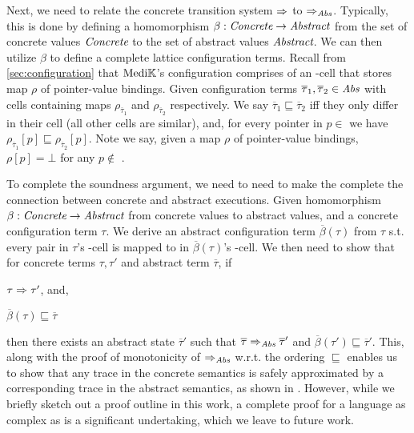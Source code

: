 Next, we need to relate the concrete transition system $\Rightarrow$ to $\Rightarrow_{\textit{Abs}}$.
Typically, this is done by defining a homomorphism $\beta: \textit{Concrete} \to \textit{Abstract}$
from the set of concrete values $\textit{Concrete}$ to the set of abstract values
$\textit{Abstract}$. We can then utilize $\beta$ to define a complete lattice
configuration terms. Recall from \autoref{sec:configuration} that
$\text{Medi}\mathbb{K}{}{}$'s configuration comprises of an -cell that
stores map $\rho$ of pointer-value bindings.
Given configuration terms $\overline{\tau}_1, \overline{\tau}_2 \in
\textit{Abs}$ with  cells containing maps $\rho_{\overline{\tau}_1}$ and
$\rho_{\overline{\tau}_2}$ respectively.
We say $\overline{\tau}_1 \sqsubseteq \overline{\tau}_2$ iff
they only differ in their
 cell (all other cells are similar), and, for every
pointer in $p \in$ 
we have $\rho_{\overline{\tau}_1}[p] \sqsubseteq \rho_{\overline{\tau}_2}[p]$. Note we
say, given a map $\rho$ of pointer-value bindings,
$\rho[p] = \bot$ for any $p \not\in$ .

To complete the soundness argument, we need to need to make the complete the connection
between concrete and abstract executions. Given homomorphism $\beta: \textit{Concrete} \to \textit{Abstract}$
from concrete values to abstract values, and a concrete configuration term
$\tau$. We derive an abstract configuration term $\overline{\beta}\left(\tau\right)$ from $\tau$ s.t.
every  pair in $\tau$'s
-cell is mapped to 
in $\overline{\beta}\left(\tau\right)$'s -cell.
We then need to show that for
concrete terms $\tau, \tau'$ and abstract term $\overline{\tau}$, if
\begin{enumerate*}[label=(\alph*)]
  \item $\tau \Rightarrow \tau'$, and,
  \item $\overline{\beta}\left(\tau\right) \sqsubseteq \overline{\tau}$
\end{enumerate*}
then there exists an abstract state $\overline{\tau}'$ such that
$\overline{\tau} \Rightarrow_{\textit{Abs}} \overline{\tau}'$ and $\overline{\beta}\left(\tau'\right) \sqsubseteq \overline{\tau}'$.
This, along with the proof of monotonicity of $\Rightarrow_{\textit{Abs}}$ w.r.t. the ordering
$\sqsubseteq$ enables us to show that any trace in the concrete semantics is safely approximated
by a corresponding trace in the abstract semantics, as shown in
\cite{SchmidtLISP98}. However, while we briefly sketch out a proof outline
in this work, a complete proof for a language as complex as \MediK{} is a
significant undertaking, which we leave to future work.

